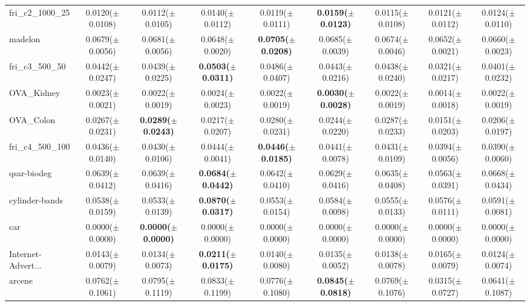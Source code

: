 \begin{longtable}{lcccccccc}
fri\_c2\_1000\_25 & 0.0120($\pm$0.0108) & 0.0112($\pm$0.0105) & 0.0140($\pm$0.0112) & 0.0119($\pm$0.0111) & \textbf{0.0159($\pm$0.0123)} & 0.0115($\pm$0.0108) & 0.0121($\pm$0.0112) & 0.0124($\pm$0.0110) \\
madelon & 0.0679($\pm$0.0056) & 0.0681($\pm$0.0056) & 0.0648($\pm$0.0020) & \textbf{0.0705($\pm$0.0208)} & 0.0685($\pm$0.0039) & 0.0674($\pm$0.0046) & 0.0652($\pm$0.0021) & 0.0660($\pm$0.0023) \\
fri\_c3\_500\_50 & 0.0442($\pm$0.0247) & 0.0439($\pm$0.0225) & \textbf{0.0503($\pm$0.0311)} & 0.0486($\pm$0.0407) & 0.0443($\pm$0.0216) & 0.0438($\pm$0.0240) & 0.0321($\pm$0.0217) & 0.0401($\pm$0.0232) \\
OVA\_Kidney & 0.0023($\pm$0.0021) & 0.0022($\pm$0.0019) & 0.0024($\pm$0.0023) & 0.0022($\pm$0.0019) & \textbf{0.0030($\pm$0.0028)} & 0.0022($\pm$0.0019) & 0.0014($\pm$0.0018) & 0.0022($\pm$0.0019) \\
OVA\_Colon & 0.0267($\pm$0.0231) & \textbf{0.0289($\pm$0.0243)} & 0.0217($\pm$0.0207) & 0.0280($\pm$0.0231) & 0.0244($\pm$0.0220) & 0.0287($\pm$0.0233) & 0.0151($\pm$0.0203) & 0.0206($\pm$0.0197) \\
fri\_c4\_500\_100 & 0.0436($\pm$0.0140) & 0.0430($\pm$0.0106) & 0.0444($\pm$0.0041) & \textbf{0.0446($\pm$0.0185)} & 0.0441($\pm$0.0078) & 0.0431($\pm$0.0109) & 0.0394($\pm$0.0056) & 0.0390($\pm$0.0060) \\
qsar-biodeg & 0.0639($\pm$0.0412) & 0.0639($\pm$0.0416) & \textbf{0.0684($\pm$0.0442)} & 0.0642($\pm$0.0410) & 0.0629($\pm$0.0416) & 0.0635($\pm$0.0408) & 0.0563($\pm$0.0391) & 0.0668($\pm$0.0434) \\
cylinder-bands & 0.0538($\pm$0.0159) & 0.0533($\pm$0.0139) & \textbf{0.0870($\pm$0.0317)} & 0.0553($\pm$0.0154) & 0.0584($\pm$0.0098) & 0.0555($\pm$0.0133) & 0.0576($\pm$0.0111) & 0.0591($\pm$0.0081) \\
car & 0.0000($\pm$0.0000) & \textbf{0.0000($\pm$0.0000)} & 0.0000($\pm$0.0000) & 0.0000($\pm$0.0000) & 0.0000($\pm$0.0000) & 0.0000($\pm$0.0000) & 0.0000($\pm$0.0000) & 0.0000($\pm$0.0000) \\
Internet-Advert... & 0.0143($\pm$0.0079) & 0.0134($\pm$0.0073) & \textbf{0.0211($\pm$0.0175)} & 0.0140($\pm$0.0080) & 0.0135($\pm$0.0052) & 0.0138($\pm$0.0078) & 0.0165($\pm$0.0079) & 0.0124($\pm$0.0074) \\
arcene & 0.0762($\pm$0.1061) & 0.0795($\pm$0.1119) & 0.0833($\pm$0.1199) & 0.0776($\pm$0.1080) & \textbf{0.0845($\pm$0.0818)} & 0.0769($\pm$0.1076) & 0.0315($\pm$0.0727) & 0.0641($\pm$0.1087) \\

\end{longtable}
